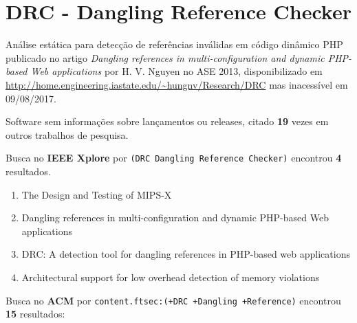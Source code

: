 \section{DRC - Dangling Reference Checker}

Análise estática para detecção de referências inválidas em código dinâmico PHP
publicado no artigo {\it Dangling references in multi-configuration and dynamic PHP-based Web applications}
por H. V. Nguyen
no ASE 2013,
disponibilizado em \url{http://home.engineering.iastate.edu/~hungnv/Research/DRC}
mas inacessível em 09/08/2017.

Software sem informações sobre lançamentos ou releases,
citado {\bf 19} vezes em outros trabalhos de pesquisa.

Busca no {\bf IEEE Xplore} por
\texttt{(DRC Dangling Reference Checker)}
encontrou {\bf 4}
resultados.

\begin{enumerate}
\item The Design and Testing of MIPS-X
\item Dangling references in multi-configuration and dynamic PHP-based Web applications
\item DRC: A detection tool for dangling references in PHP-based web applications
\item Architectural support for low overhead detection of memory violations
\end{enumerate}

Busca no {\bf ACM} por
\texttt{content.ftsec:(+DRC +Dangling +Reference)}
encontrou {\bf 15}
resultados:


